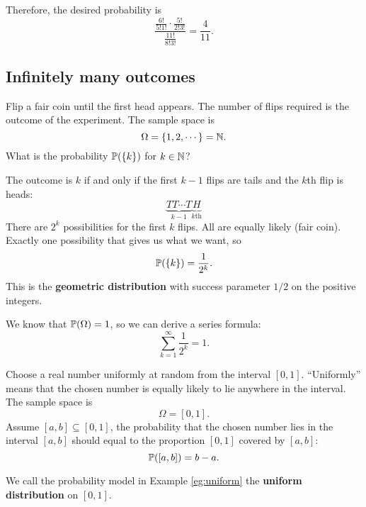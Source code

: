   Therefore, the desired probability is
  \[
    \frac{\frac{6!}{5!1!}\cdot \frac{5!}{2!3!}}{\frac{11!}{8!3!}} = \frac{4}{11}.
  \]
  
  
  \subsection{Infinitely many outcomes}
  \label{subsec:1.3}
  \begin{example}
    Flip a fair coin until the first head appears. The number of flips required
    is the outcome of the experiment. The sample space is
    \[
      \Omega = \{1, 2,\cdots\} = \mathbb{N}.
    \]
    What is the probability $\mathbb{P}(\{k\})$ for $k\in \mathbb{N}$?
  \end{example}
  The outcome is $k$ if and only if the first $k-1$ flips are tails and the
  $k$th flip is heads:
  \[
    \underbrace{TT\cdots T}_{k-1}\underbrace{H}_{k\text{th}}
  \]
  There are $2^k$ possibilities for the first $k$ flips. All are equally likely
  (fair coin). Exactly one possibility that gives us what we want, so
  \[
    \mathbb{P}(\{k\}) = \frac{1}{2^k}.
  \]
  This is the \textbf{geometric distribution} with success parameter $1/2$ on
  the positive integers.
  \begin{remark}
    We know that $\mathbb{P}(\Omega) = 1$, so we can derive a series formula:
    \[
      \sum_{k=1}^\infty \frac{1}{2^k} = 1.
    \]
  \end{remark}
  \begin{example}
    \label{eg:uniform}
    Choose a real number uniformly at random from the interval $[0,1]$.
    ``Uniformly'' means that the chosen number is equally likely to lie
    anywhere in the interval. The sample space is
    \[
      \Omega=[0,1].
    \]
    Assume $[a,b]\subseteq [0,1]$, the probability that the chosen number lies
    in the interval $[a,b]$ should equal to the proportion $[0,1]$ covered by
    $[a,b]$:
    \[
      \mathbb{P}([a,b])=b-a.
    \]
  \end{example}
    We call the probability model in Example \ref{eg:uniform} the
    \textbf{uniform distribution} on $[0,1]$.

